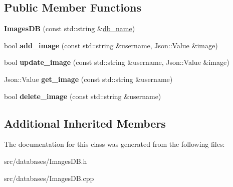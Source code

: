 \subsection*{Public Member Functions}
\begin{DoxyCompactItemize}
\item 
{\bfseries Images\+DB} (const std\+::string \&\hyperlink{classDB_a8c58fbd6650f3d5850adf699d1ee7ada}{db\+\_\+name})\hypertarget{classImagesDB_afbd113bc78924409880e61fe0f73b453}{}\label{classImagesDB_afbd113bc78924409880e61fe0f73b453}

\item 
bool {\bfseries add\+\_\+image} (const std\+::string \&username, Json\+::\+Value \&image)\hypertarget{classImagesDB_a5b667955974742b8dfae33832bf4539c}{}\label{classImagesDB_a5b667955974742b8dfae33832bf4539c}

\item 
bool {\bfseries update\+\_\+image} (const std\+::string \&username, Json\+::\+Value \&image)\hypertarget{classImagesDB_a45ed276c0d5ec103e9cae2bc944e54f5}{}\label{classImagesDB_a45ed276c0d5ec103e9cae2bc944e54f5}

\item 
Json\+::\+Value {\bfseries get\+\_\+image} (const std\+::string \&username)\hypertarget{classImagesDB_aaf909430b096a53bab515cbe5bae52f2}{}\label{classImagesDB_aaf909430b096a53bab515cbe5bae52f2}

\item 
bool {\bfseries delete\+\_\+image} (const std\+::string \&username)\hypertarget{classImagesDB_a9fb30b73871d85450dc413afce86c336}{}\label{classImagesDB_a9fb30b73871d85450dc413afce86c336}

\end{DoxyCompactItemize}
\subsection*{Additional Inherited Members}


The documentation for this class was generated from the following files\+:\begin{DoxyCompactItemize}
\item 
src/databases/Images\+D\+B.\+h\item 
src/databases/Images\+D\+B.\+cpp\end{DoxyCompactItemize}
